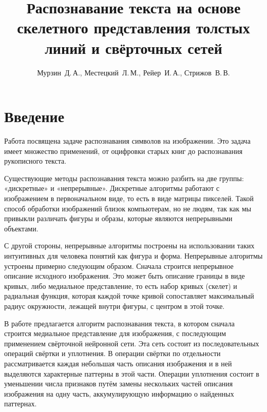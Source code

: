 \documentclass[12pt,twoside]{article}
\title
    {Распознавание текста на основе скелетного представления толстых линий и свёрточных сетей}
\author
    {Мурзин~Д.\,А., Местецкий~Л.\,М., Рейер~И.\,А., Стрижов~В.\,В.} %
\begin{document}
\maketitle
\section{Введение}
Работа посвящена задаче распознавания символов на изображении. Это задача имеет множество применений, от оцифровки старых книг до распознавания рукописного текста.

Существующие методы распознавания текста можно разбить на две группы: «дискретные» и «непрерывные». Дискретные алгоритмы работают с изображением в первоначальном виде, то есть в виде матрицы пикселей. Такой способ обработки изображений близок компьютерам, но не людям, так как мы привыкли различать фигуры и образы, которые являются непрерывными объектами.

С другой стороны, непрерывные алгоритмы построены на использовании таких интуитивных для человека понятий как фигура и форма. Непрерывные алгоритмы устроены примерно следующим образом. Сначала строится непрерывное описание исходного изображения. Это может быть описание границы в виде кривых, либо медиальное представление, то есть набор кривых (скелет) и радиальная функция, которая каждой точке кривой сопоставляет максимальный радиус окружности, лежащей внутри фигуры, с центром в этой точке.

В работе предлагается алгоритм распознавания текста, в котором сначала строится медиальное представление для изображения, с последующим применением свёрточной нейронной сети. Эта сеть состоит из последовательных операций свёртки и уплотнения. В операции свёртки по отдельности рассматривается каждая небольшая часть описания изображения и в ней выделяются характерные паттерны в этой части. Операции уплотнения состоит в уменьшении числа признаков путём замены нескольких частей описания изображения на одну часть, аккумулирующую информацию о найденных паттернах. 

\nocite{*}



\end{document}
